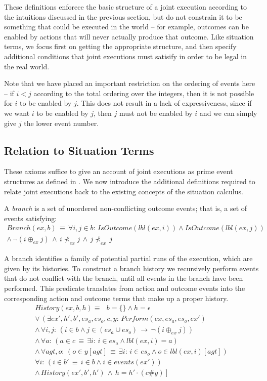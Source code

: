 These definitions enforece the basic structure of a joint execution
according to the intuitions discussed in the previous section, but
do not constrain it to be something that could be executed in the
world -- for example, outcomes can be enabled by actions that will
never actually produce that outcome. Like situation terms, we focus
first on getting the appropriate structure, and then specify additional
conditions that joint executions must satisify in order to be legal
in the real world.

Note that we have placed an important restriction on the ordering
of events here -- if $i<j$ according to the total ordering over the
integers, then it is not possible for $i$ to be enabled by $j$.
This does not result in a lack of expressiveness, since if we want
$i$ to be enabled by $j$, then $j$ must not be enabled by $i$
and we can simply give $j$ the lower event number.


\subsection{Relation to Situation Terms}

These axioms suffice to give an account of joint executions as prime
event structures as defined in \citep{npw79event_structures}. We
now introduce the additional definitions required to relate joint
executions back to the existing concepts of the situation calculus.

A \emph{branch} is a set of unordered non-conflicting outcome events;
that is, a set of events satisfying:\begin{multline*}
Branch(ex,b)\,\equiv\,\forall i,j\in b:\, IsOutcome(lbl(ex,i))\wedge IsOutcome(lbl(ex,j))\\
\wedge\,\neg(i\oplus_{ex}j)\,\wedge\, i\not\prec_{ex}j\,\wedge\, j\not\prec_{ex}\, j\end{multline*}


A branch identifies a family of potential partial runs of the execution,
which are given by its histories. To construct a branch history we
recursively perform events that do not conflict with the branch, until
all events in the branch have been performed. This predicate translates
from action and outcome events into the corresponding action and outcome
terms that make up a proper history. \begin{gather*}
History(ex,b,h)\equiv\,\,\,\, b=\{\}\wedge h=\epsilon\\
\vee\,\left(\exists ex',h',b',es_{a},es_{o},c,y:\, Perform(ex,es_{a},es_{o},ex')\right.\\
\wedge\,\forall i,j:\,\left(i\in b\wedge j\in(es_{a}\cup es_{o})\,\rightarrow\,\neg(i\oplus_{ex}j)\right)\\
\wedge\,\forall a:\,\left(a\in c\,\equiv\,\exists i:\, i\in es_{a}\wedge lbl(ex,i)=a\right)\\
\wedge\,\forall agt,o:\,\left(o\in y[agt]\,\equiv\,\exists i:\, i\in es_{o}\wedge o\in lbl(ex,i)[agt]\right)\\
\forall i:\,\left(i\in b'\,\equiv\, i\in b\wedge i\in events(ex')\right)\\
\left.\wedge\, History(ex',b',h')\,\wedge\, h=h'\cdot(c\#y)\right]\end{gather*}


